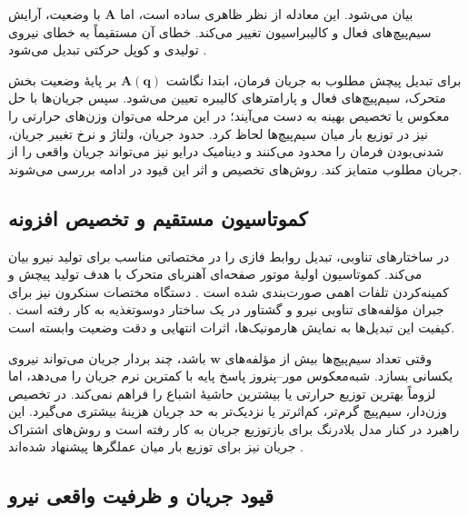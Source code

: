بیان می‌شود. این معادله از نظر ظاهری ساده است، اما $\mathbf{A}$ با وضعیت، آرایش سیم‌پیچ‌های فعال و کالیبراسیون تغییر می‌کند. خطای آن مستقیماً به خطای نیروی تولیدی و کوپل حرکتی تبدیل می‌شود \cite{hu6DOFExtendedUnified2024}.

برای تبدیل پیچش مطلوب به جریان فرمان، ابتدا نگاشت $\mathbf{A}(\mathbf{q})$ بر پایهٔ وضعیت بخش متحرک، سیم‌پیچ‌های فعال و پارامترهای کالیبره تعیین می‌شود. سپس جریان‌ها با حل معکوس یا تخصیص بهینه به دست می‌آیند؛ در این مرحله می‌توان وزن‌های حرارتی را نیز در توزیع بار میان سیم‌پیچ‌ها لحاظ کرد. حدود جریان، ولتاژ و نرخ تغییر جریان، شدنی‌بودن فرمان را محدود می‌کنند و دینامیک درایو نیز می‌تواند جریان واقعی را از جریان مطلوب متمایز کند. روش‌های تخصیص و اثر این قیود در ادامه بررسی می‌شوند.

\subsection{کموتاسیون مستقیم و تخصیص افزونه}
\label{subsec:commutation_allocation_methods}

در ساختارهای تناوبی، تبدیل  روابط فازی را در مختصاتی مناسب برای تولید نیرو بیان می‌کند. کموتاسیون اولیهٔ موتور صفحه‌ای آهنربای متحرک با هدف تولید پیچش و کمینه‌کردن تلفات اهمی صورت‌بندی شده است \cite{cmmCommutationMagneticallyLevitated2008}. دستگاه مختصات سنکرون نیز برای جبران مؤلفه‌های تناوبی نیرو و گشتاور در یک ساختار دوسوتغذیه به کار رفته است \cite{wangMagneticLevitationControl2024}. کیفیت این تبدیل‌ها به نمایش هارمونیک‌ها، اثرات انتهایی و دقت وضعیت وابسته است.

وقتی تعداد سیم‌پیچ‌ها بیش از مؤلفه‌های $\mathbf{w}$ باشد، چند بردار جریان می‌تواند نیروی یکسانی بسازد. شبه‌معکوس مور--پنروز پاسخ پایه با کمترین نرم جریان را می‌دهد، اما لزوماً بهترین توزیع حرارتی یا بیشترین حاشیهٔ اشباع را فراهم نمی‌کند. در تخصیص وزن‌دار، سیم‌پیچ گرم‌تر، کم‌اثرتر یا نزدیک‌تر به حد جریان هزینهٔ بیشتری می‌گیرد. این راهبرد در کنار مدل بلادرنگ برای بازتوزیع جریان به کار رفته است \cite{wangMagnetcoilRoleswitchingRealtime2024} و روش‌های اشتراک جریان نیز برای توزیع بار میان عملگرها پیشنهاد شده‌اند \cite{xuDesignImplementationControl2024}.

\subsection{قیود جریان و ظرفیت واقعی نیرو}
\label{subsec:constrained_allocation}
\label{subsec:current_saturation}

